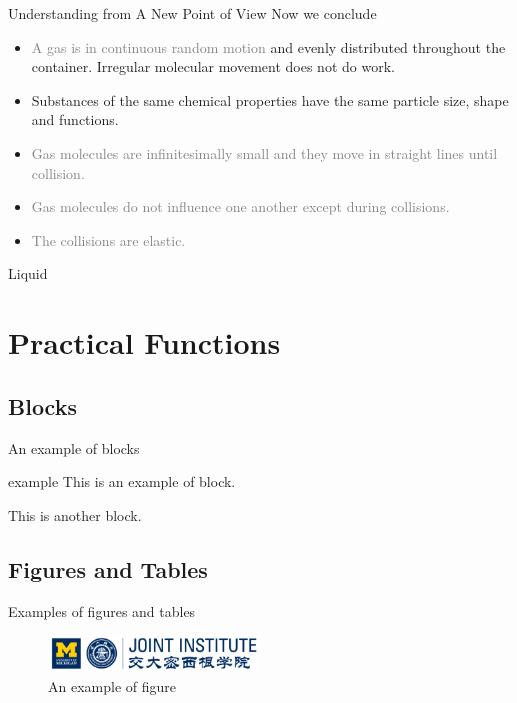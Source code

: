 \documentclass[12pt,compress]{beamer}
\begin{document}
\begin{frame}{Understanding from A New Point of View}
	Now we conclude
	\begin{itemize}
		\item \textcolor{gray}{A gas is in continuous random motion} and
			evenly distributed throughout the container. Irregular molecular 
			movement does not do work.
		\item Substances of the same chemical properties have the same particle size, 
			shape and functions.
		\item \textcolor{gray}{Gas molecules are infinitesimally small and they move in straight 
			lines until collision.}
		\item \textcolor{gray}{Gas molecules do not influence one another except 
			during collisions.}
		\item \textcolor{gray}{The collisions are elastic.}
	\end{itemize}
\end{frame}

\begin{frame}{Liquid}

\end{frame}


\section{Practical Functions}

\subsection{Blocks}
\begin{frame}{An example of blocks}
	\begin{block}{example}
		This is an example of block.
	\end{block}
	\begin{block}{}
		This is another block.
	\end{block}
\end{frame}

\subsection{Figures and Tables}
\begin{frame}{Examples of figures and tables}
	\begin{figure}
		\centering
		\includegraphics[width=0.5\textwidth]{umji.png}
		\caption{An example of figure}
		\label{fig:demofig-1}
	\end{figure}
\end{frame}
\end{document}
